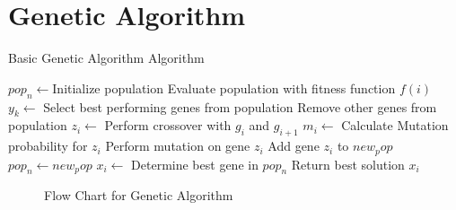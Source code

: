 \section{Genetic Algorithm}
\begin{algorithm}
\caption{Basic Genetic Algorithm Algorithm}
\label{alg:GA}
	\begin{algorithmic}[1]
		\STATE $pop_n\leftarrow$Initialize population
		\STATE Evaluate population with fitness function $f(i)$
		\STATE $y_k \leftarrow$ Select best performing genes from population
		\STATE Remove other genes from population
		\REPEAT
				\STATE $z_i \leftarrow$ Perform crossover with $g_i$ and $g_{i+1}$
				\STATE $m_i\leftarrow$ Calculate Mutation probability for $z_i$
					\STATE Perform mutation on gene $z_i$
				\ENDIF
				\STATE Add gene $z_i$ to $new_pop$
			\ENDFOR
		\STATE $pop_n \leftarrow new_pop$
		\ENDWHILE
		\STATE $x_i \leftarrow$ Determine best gene in $pop_n$
		\STATE Return best solution $x_i$
	\end{algorithmic}
\end{algorithm}
\label{sec:geneticalgorithm}
\begin{figure}[htbp!]
	\begin{center}
	\caption{Flow Chart for Genetic Algorithm}
	\label{fig:GeneticAlgorithmFlowChart}
	\end{center}
\end{figure}
